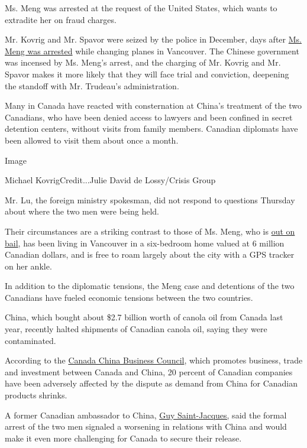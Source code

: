 Ms. Meng was arrested at the request of the United States, which wants
to extradite her on fraud charges.

Mr. Kovrig and Mr. Spavor were seized by the police in December, days
after
\href{https://www.nytimes.com/2018/12/05/business/huawei-cfo-arrest-canada-extradition.html}{Ms.
Meng was arrested} while changing planes in Vancouver. The Chinese
government was incensed by Ms. Meng's arrest, and the charging of Mr.
Kovrig and Mr. Spavor makes it more likely that they will face trial and
conviction, deepening the standoff with Mr. Trudeau's administration.

Many in Canada have reacted with consternation at China's treatment of
the two Canadians, who have been denied access to lawyers and been
confined in secret detention centers, without visits from family
members. Canadian diplomats have been allowed to visit them about once a
month.

Image

Michael KovrigCredit...Julie David de Lossy/Crisis Group

Mr. Lu, the foreign ministry spokesman, did not respond to questions
Thursday about where the two men were being held.

Their circumstances are a striking contrast to those of Ms. Meng, who is
\href{https://www.nytimes.com/2019/05/08/world/canada/huawei-meng-wanzhou-extradition.html}{out
on bail}, has been living in Vancouver in a six-bedroom home valued at 6
million Canadian dollars, and is free to roam largely about the city
with a GPS tracker on her ankle.

In addition to the diplomatic tensions, the Meng case and detentions of
the two Canadians have fueled economic tensions between the two
countries.

China, which bought about \$2.7 billion worth of canola oil from Canada
last year, recently halted shipments of Canadian canola oil, saying they
were contaminated.

According to the
\href{https://ccbc.com/ccbc-canada-china-business-survey-2018-2019/}{Canada
China Business Council}, which promotes business, trade and investment
between Canada and China, 20 percent of Canadian companies have been
adversely affected by the dispute as demand from China for Canadian
products shrinks.

A former Canadian ambassador to China,
\href{https://www.ualberta.ca/china-institute/about/people/senior-fellows/guy-saint-jacques}{Guy
Saint-Jacques,} said the formal arrest of the two men signaled a
worsening in relations with China and would make it even more
challenging for Canada to secure their release.

